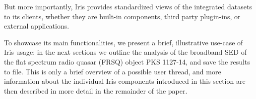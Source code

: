 \documentclass[final,5p]{elsarticle}
\begin{document}
But more importantly, Iris provides standardized views of the integrated datasets to its clients, whether they are built-in components, third party plugin-ins, or external applications.


To showcase its main functionalities, we present a brief, illustrative use-case of Iris usage: in the next sections we outline the analysis of the broadband SED of the flat spectrum radio quasar (FRSQ) object PKS 1127-14, and save the results to file. This is only a brief overview of a possible user thread, and more information about the individual Iris components introduced in this section are then described in more detail in the remainder of the paper.



\end{document}
